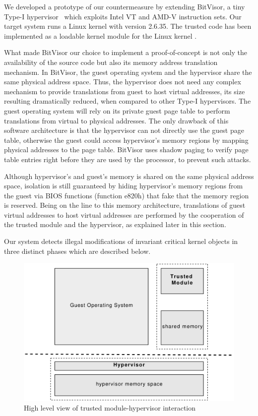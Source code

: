 We developed a prototype of our countermeasure by extending BitVisor, a tiny Type-I hypervisor~\cite{1508311} which exploits Intel VT and AMD-V instruction sets. Our target system runs a Linux kernel with version 2.6.35. The trusted code has been implemented as a loadable kernel module for the Linux kernel \cite{linuxdevicedrivers}.
 
What made BitVisor our choice to implement a proof-of-concept is not only the availability of the source code but also its memory address translation mechanism. In BitVisor, the guest operating system and the hypervisor share the same physical address space. Thus, the hypervisor does not need any complex mechanism to provide translations from guest to host virtual addresses, its size resulting dramatically reduced, when compared to other Type-I hypervisors.  
The guest operating system will rely on its private guest page table to perform translations from virtual to physical addresses. The only drawback of this software architecture is that the hypervisor can not directly use the guest page table, otherwise the guest could access hypervisor's memory regions by mapping physical addresses to the page table. BitVisor uses shadow paging to verify page table entries right before they are used by the processor, to prevent such attacks.
 
Although hypervisor's and guest's memory is shared on the same physical address space, isolation is still guaranteed by hiding hypervisor's memory regions from the guest via BIOS functions (function e820h) that fake that the memory region is reserved. 
Being on the line to this memory architecture, translations of guest virtual addresses to host virtual addresses are performed by the cooperation of the trusted module and the hypervisor, as explained later in this section. 


Our system detects illegal modifications of invariant critical kernel objects in three distinct phases which are described below.


\begin{figure}[htbp] 
\begin{center}
\includegraphics[scale=0.6]{images/schema_tm_hyperv.pdf}
\caption{{High level view of trusted module-hypervisor interaction}}
\label{schema_tm_hyperv}
\end{center}
\end{figure}


